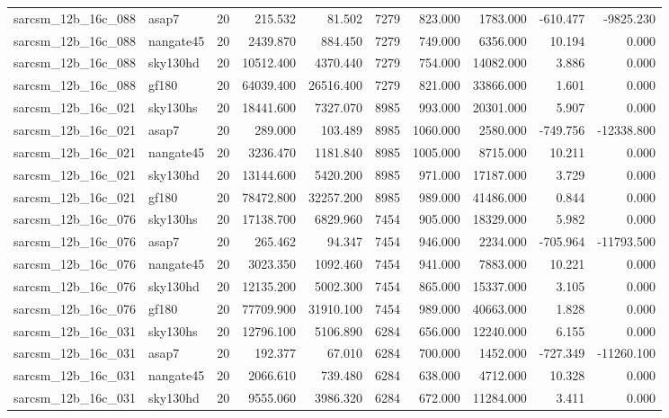 \begin{longtable}{llrrrrrrrr}
sarcsm\_12b\_16c\_088 & asap7 & 20 & 215.532 & 81.502 & 7279 & 823.000 & 1783.000 & -610.477 & -9825.230 \\
sarcsm\_12b\_16c\_088 & nangate45 & 20 & 2439.870 & 884.450 & 7279 & 749.000 & 6356.000 & 10.194 & 0.000 \\
sarcsm\_12b\_16c\_088 & sky130hd & 20 & 10512.400 & 4370.440 & 7279 & 754.000 & 14082.000 & 3.886 & 0.000 \\
sarcsm\_12b\_16c\_088 & gf180 & 20 & 64039.400 & 26516.400 & 7279 & 821.000 & 33866.000 & 1.601 & 0.000 \\
sarcsm\_12b\_16c\_021 & sky130hs & 20 & 18441.600 & 7327.070 & 8985 & 993.000 & 20301.000 & 5.907 & 0.000 \\
sarcsm\_12b\_16c\_021 & asap7 & 20 & 289.000 & 103.489 & 8985 & 1060.000 & 2580.000 & -749.756 & -12338.800 \\
sarcsm\_12b\_16c\_021 & nangate45 & 20 & 3236.470 & 1181.840 & 8985 & 1005.000 & 8715.000 & 10.211 & 0.000 \\
sarcsm\_12b\_16c\_021 & sky130hd & 20 & 13144.600 & 5420.200 & 8985 & 971.000 & 17187.000 & 3.729 & 0.000 \\
sarcsm\_12b\_16c\_021 & gf180 & 20 & 78472.800 & 32257.200 & 8985 & 989.000 & 41486.000 & 0.844 & 0.000 \\
sarcsm\_12b\_16c\_076 & sky130hs & 20 & 17138.700 & 6829.960 & 7454 & 905.000 & 18329.000 & 5.982 & 0.000 \\
sarcsm\_12b\_16c\_076 & asap7 & 20 & 265.462 & 94.347 & 7454 & 946.000 & 2234.000 & -705.964 & -11793.500 \\
sarcsm\_12b\_16c\_076 & nangate45 & 20 & 3023.350 & 1092.460 & 7454 & 941.000 & 7883.000 & 10.221 & 0.000 \\
sarcsm\_12b\_16c\_076 & sky130hd & 20 & 12135.200 & 5002.300 & 7454 & 865.000 & 15337.000 & 3.105 & 0.000 \\
sarcsm\_12b\_16c\_076 & gf180 & 20 & 77709.900 & 31910.100 & 7454 & 989.000 & 40663.000 & 1.828 & 0.000 \\
sarcsm\_12b\_16c\_031 & sky130hs & 20 & 12796.100 & 5106.890 & 6284 & 656.000 & 12240.000 & 6.155 & 0.000 \\
sarcsm\_12b\_16c\_031 & asap7 & 20 & 192.377 & 67.010 & 6284 & 700.000 & 1452.000 & -727.349 & -11260.100 \\
sarcsm\_12b\_16c\_031 & nangate45 & 20 & 2066.610 & 739.480 & 6284 & 638.000 & 4712.000 & 10.328 & 0.000 \\
sarcsm\_12b\_16c\_031 & sky130hd & 20 & 9555.060 & 3986.320 & 6284 & 672.000 & 11284.000 & 3.411 & 0.000 \\

\end{longtable}
